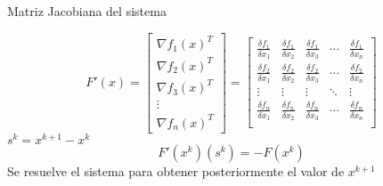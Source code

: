 \begin{center}
Matriz Jacobiana del sistema
\end{center}
\begin{displaymath}
F'(x)=\begin{bmatrix}
\nabla f_1(x)^T \\
\nabla f_2(x)^T \\
\nabla f_3(x)^T \\
\vdots \\
\nabla f_n(x)^T
\end{bmatrix}=\begin{bmatrix}
\frac{\delta f_1}{\delta x_1} & \frac{\delta f_1}{\delta x_2} & \frac{\delta f_1}{\delta x_3} & \cdots & \frac{\delta f_1}{\delta x_n} \\
\frac{\delta f_2}{\delta x_1} & \frac{\delta f_2}{\delta x_2} & \frac{\delta f_2}{\delta x_3} & \cdots & \frac{\delta f_2}{\delta x_n} \\
\vdots & \vdots & \vdots & \ddots & \vdots \\ \frac{\delta f_n}{\delta x_1} & \frac{\delta f_n}{\delta x_2} & \frac{\delta f_n}{\delta x_3} & \cdots & \frac{\delta f_n}{\delta x_n} \\
\end{bmatrix}
\end{displaymath}
$s^k=x^{k+1}-x^k$\\
\begin{displaymath}
F'(x^k)(s^k)=-F(x^k)
\end{displaymath}
Se resuelve el sistema para obtener posteriormente el valor de $x^{k+1}$




